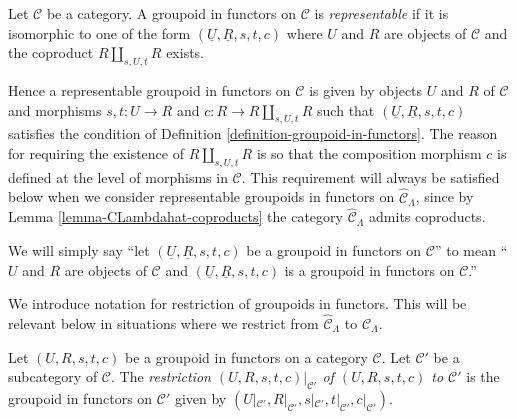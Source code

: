 \begin{definition}
\label{definition-representable}
Let $\mathcal{C}$ be a category.  A groupoid in functors on $\mathcal{C}$ is 
{\it representable} if it is isomorphic to one of the form $(\underline{U}, 
\underline{R}, s,t,c)$ where $U$ and $R$ are objects of $\mathcal{C}$ and the 
coproduct $R \coprod_{s,U,t} R$ exists.
\end{definition}

\begin{remark}
\label{remark-reason-existence-coproduct}
Hence a representable groupoid in functors on $\mathcal{C}$ is given by objects 
$U$ and $R$ of $\mathcal{C}$ and morphisms $s,t: U \to R$ and $c: R 
\to R \coprod_{s,U,t} R$ such that 
$(\underline{U},\underline{R},s,t,c)$ satisfies the condition of Definition 
\ref{definition-groupoid-in-functors}. The reason for requiring the existence 
of $R \coprod_{s,U,t} R$ is so that the composition morphism $c$ is defined at 
the level of morphisms in $\mathcal{C}$.  This requirement will always be 
satisfied below when we consider representable groupoids in functors on 
$\widehat{\mathcal{C}}_\Lambda$, since by Lemma 
\ref{lemma-CLambdahat-coproducts} the category $\widehat{\mathcal{C}}_\Lambda$ 
admits coproducts.
\end{remark}

\begin{remark}
\label{remark-simplify-terminology}
We will simply say ``let $(\underline{U}, \underline{R}, s,t,c)$ be a groupoid 
in functors on $\mathcal{C}$'' to mean ``$U$ and $R$ are objects of
$\mathcal{C}$ 
and $(\underline{U}, \underline{R}, s,t,c)$ is a groupoid in functors on 
$\mathcal{C}$.''
\end{remark}

\noindent
We introduce notation for restriction of groupoids in functors. This will be 
relevant below in situations where we restrict from $\widehat{\mathcal 
C}_\Lambda$ to $\mathcal{C}_\Lambda$.

\begin{definition}
\label{definition-restricting-groupoids-in-functors}
Let $(U,R,s,t,c)$ be a groupoid in functors on a category $\mathcal{C}$.  Let 
$\mathcal{C}'$ be a subcategory of $\mathcal{C}$.  The {\it restriction 
$(U,R,s,t,c)|_{\mathcal{C}'}$ of $(U,R,s,t,c)$ to $\mathcal{C}'$} is the
groupoid 
in functors on $\mathcal{C}'$ given by $(U|_{\mathcal{C}'},R|_{\mathcal 
C'},s|_{\mathcal{C}'},t|_{\mathcal{C}'},c|_{\mathcal{C}'})$.
\end{definition}

